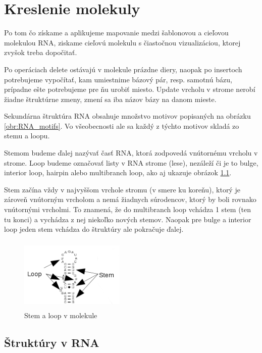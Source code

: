 \newcommand{\degree}{\ensuremath{^{\circ}}}

\chapter{Kreslenie molekuly}

Po tom čo získame a aplikujeme mapovanie medzi šablonovou a cieľovou molekulou RNA,
ziskame cieľovú molekulu s čiastočnou vizualizáciou, ktorej zvyšok treba dopočitať.

Po operáciach delete ostávajú v molekule prázdne diery, naopak po insertoch potrebujeme
vypočítať, kam umiestnime bázový pár, resp. samotnú bázu, prípadne ešte potrebujeme pre
ňu urobiť miesto. Update vrcholu v strome nerobí žiadne štruktúrne zmeny, zmení sa iba
názov bázy na danom mieste.

Sekundárna štruktúra RNA obsahuje množstvo motivov popisaných na obrázku \ref{obr:RNA_motifs}.
Vo všeobecnosti ale sa každý z týchto motivov skladá zo stemu a loopu.

Stemom budeme ďalej nazývať časť RNA, ktorá zodpovedá vnútornému vrcholu v strome. Loop
budeme označovať listy v RNA strome (lese), nezáleží či je to bulge, interior loop, hairpin
alebo multibranch loop, ako aj ukazuje obrázok \ref{obr:RNA_motifs_stem_loop}.

Stem začína vždy v najvyššom vrchole stromu (v smere ku koreňu), ktorý je zároveň vnútorným
vrcholom a nemá žiadnych súrodencov, ktorý by boli rovnako vnútornými vrcholmi.
To znamená, že do multibranch loop vchádza 1 stem (ten tu konci) a vychádza z nej niekoľko nových stemov.
Naopak pre bulge a interior loop jeden stem vchádza do štruktúry ale pokračuje ďalej.

\begin{figure}[H]
\centering
\includegraphics[width=50mm, height=35mm]{../img/struktury_v_rna-stem_loop.png}
\caption{Stem a loop v molekule}
\label{obr:RNA_motifs_stem_loop}
\end{figure}

\section{Štruktúry v RNA}


